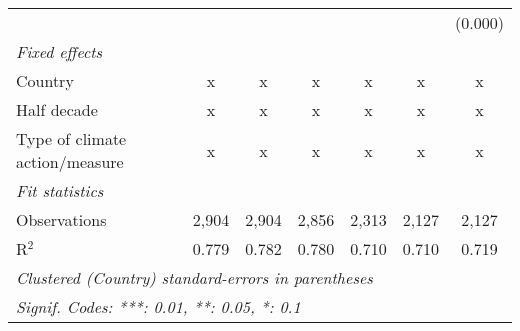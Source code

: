 \begin{tabular}{lcccccc}
                                                                 &         &         &         &               &               & (0.000)\\   
   \emph{Fixed effects}\\
   Country                                                       & x       & x       & x       & x             & x             & x\\  
   Half decade                                                   & x       & x       & x       & x             & x             & x\\  
   Type of climate action/measure                                & x       & x       & x       & x             & x             & x\\  
   \midrule \emph{Fit statistics}\\
   Observations                                                  & 2,904   & 2,904   & 2,856   & 2,313         & 2,127         & 2,127\\  
   R$^2$                                                         & 0.779   & 0.782   & 0.780   & 0.710         & 0.710         & 0.719\\  
   \midrule
   \multicolumn{7}{l}{\emph{Clustered (Country) standard-errors in parentheses}}\\
   \multicolumn{7}{l}{\emph{Signif. Codes: ***: 0.01, **: 0.05, *: 0.1}}\\
\end{tabular}
\par\endgroup



